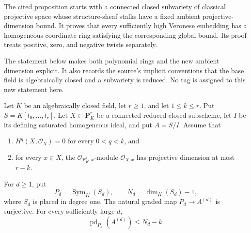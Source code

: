 \begin{lemma}
\label{lemma-veronese-projective-dimension}
\begin{reference}
\cite[Chapter III, \S 5, no. 77, Proposition 4 and proof,
pp. 272--273]{FAC}
\end{reference}
\begin{history}
The cited proposition starts with a connected closed subvariety of classical
projective space whose structure-sheaf stalks have a fixed ambient
projective-dimension bound. It proves that every sufficiently high Veronese
embedding has a homogeneous coordinate ring satisfying the corresponding
global bound. Its proof treats positive, zero, and negative twists separately.

The statement below makes both polynomial rings and the new ambient dimension
explicit. It also records the source's implicit conventions that the base
field is algebraically closed and a subvariety is reduced. No tag is assigned
to this new statement here.
\end{history}
Let $K$ be an algebraically closed field, let $r\geq1$, and let
$1\leq k\leq r$. Put $S=K[t_0,\ldots,t_r]$. Let
$X\subset\mathbf P^r_K$ be a connected reduced closed subscheme, let $I$
be its defining saturated homogeneous ideal, and put $A=S/I$. Assume that
\begin{enumerate}
\item $H^q(X,\mathcal O_X)=0$ for every $0<q<k$, and
\item for every $x\in X$, the $\mathcal O_{\mathbf P^r_K,x}$-module
$\mathcal O_{X,x}$ has projective dimension at most $r-k$.
\end{enumerate}
For $d\geq1$, put
$$
P_d=\operatorname{Sym}_K(S_d),\qquad
N_d=\dim_K(S_d)-1,
$$
where $S_d$ is placed in degree one. The natural graded map
$P_d\to A^{(d)}$ is surjective. For every sufficiently large $d$,
$$
\operatorname{pd}_{P_d}(A^{(d)})\leq N_d-k.
$$
\end{lemma}

